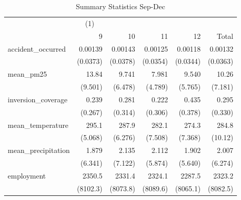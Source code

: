 \begin{table}[htbp]\centering
\caption{Summary Statistics Sep-Dec\label{sumstats9-12}}
\begin{tabular}{l*{5}{D{.}{.}{-1}}}
\toprule
                    &&            &            &            &            \\
                    &           9&          10&          11&          12&       Total\\
\midrule
accident\_occurred   &     0.00139&     0.00143&     0.00125&     0.00118&     0.00132\\
                    &    (0.0373)&    (0.0378)&    (0.0354)&    (0.0344)&    (0.0363)\\
\addlinespace
mean\_pm25           &       13.84&       9.741&       7.981&       9.540&       10.26\\
                    &     (9.501)&     (6.478)&     (4.789)&     (5.765)&     (7.181)\\
\addlinespace
inversion\_coverage  &       0.239&       0.281&       0.222&       0.435&       0.295\\
                    &     (0.267)&     (0.314)&     (0.306)&     (0.378)&     (0.330)\\
\addlinespace
mean\_temperature    &       295.1&       287.9&       282.1&       274.3&       284.8\\
                    &     (5.068)&     (6.276)&     (7.508)&     (7.368)&     (10.12)\\
\addlinespace
mean\_precipitation  &       1.879&       2.135&       2.112&       1.902&       2.007\\
                    &     (6.341)&     (7.122)&     (5.874)&     (5.640)&     (6.274)\\
\addlinespace
employment          &      2350.5&      2331.4&      2324.1&      2287.5&      2323.2\\
                    &    (8102.3)&    (8073.8)&    (8089.6)&    (8065.1)&    (8082.5)\\
\bottomrule
\end{tabular}
\end{table}
